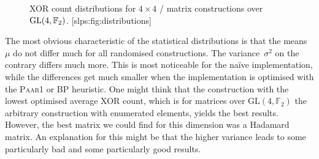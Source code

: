 \begin{figure}
\begin{sidecaption}{%
    XOR count distributions for $4 \times 4$ \MDSs/ matrix constructions over $\mathrm{GL}(4, \mathbb{F}_2)$.
}[slps:fig:distributions]
\end{sidecaption}
\end{figure}

The most obvious characteristic of the statistical distributions is that the means~$\mu$ do not differ much for all randomised constructions.
The variance~$\sigma^2$ on the contrary differs much more.
This is most noticeable for the na\"ive implementation, while the differences get much smaller when the implementation is optimised with the \textsc{Paar1} or \textsc{BP} heuristic.
One might think that the construction with the lowest optimised average XOR count, which is for matrices over $\mathrm{GL}(4, \mathbb{F}_2)$ the arbitrary construction with enumerated elements, yields the best results.
However, the best matrix we could find for this dimension was a Hadamard matrix.
An explanation for this might be that the higher variance leads to some particularly bad and some particularly good results.

